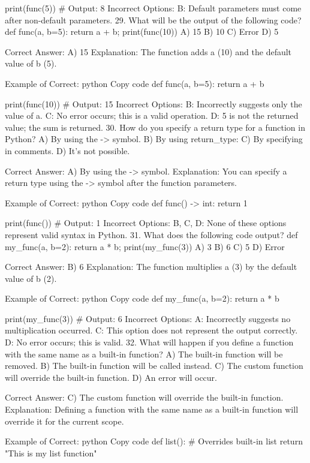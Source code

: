 print(func(5))  # Output: 8
Incorrect Options:
B: Default parameters must come after non-default parameters.
29. What will be the output of the following code? def func(a, b=5): return a + b; print(func(10))
A) 15
B) 10
C) Error
D) 5

Correct Answer: A) 15
Explanation: The function adds a (10) and the default value of b (5).

Example of Correct:
python
Copy code
def func(a, b=5):
    return a + b

print(func(10))  # Output: 15
Incorrect Options:
B: Incorrectly suggests only the value of a.
C: No error occurs; this is a valid operation.
D: 5 is not the returned value; the sum is returned.
30. How do you specify a return type for a function in Python?
A) By using the -> symbol.
B) By using return_type:
C) By specifying in comments.
D) It's not possible.

Correct Answer: A) By using the -> symbol.
Explanation: You can specify a return type using the -> symbol after the function parameters.

Example of Correct:
python
Copy code
def func() -> int:
    return 1

print(func())  # Output: 1
Incorrect Options:
B, C, D: None of these options represent valid syntax in Python.
31. What does the following code output? def my_func(a, b=2): return a * b; print(my_func(3))
A) 3
B) 6
C) 5
D) Error

Correct Answer: B) 6
Explanation: The function multiplies a (3) by the default value of b (2).

Example of Correct:
python
Copy code
def my_func(a, b=2):
    return a * b

print(my_func(3))  # Output: 6
Incorrect Options:
A: Incorrectly suggests no multiplication occurred.
C: This option does not represent the output correctly.
D: No error occurs; this is valid.
32. What will happen if you define a function with the same name as a built-in function?
A) The built-in function will be removed.
B) The built-in function will be called instead.
C) The custom function will override the built-in function.
D) An error will occur.

Correct Answer: C) The custom function will override the built-in function.
Explanation: Defining a function with the same name as a built-in function will override it for the current scope.

Example of Correct:
python
Copy code
def list():  # Overrides built-in list
    return "This is my list function"

